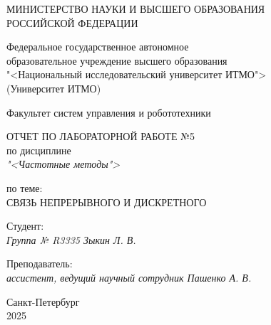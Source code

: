 \thispagestyle{empty}

\begin{center}
    МИНИСТЕРСТВО НАУКИ И ВЫСШЕГО ОБРАЗОВАНИЯ \\ РОССИЙСКОЙ ФЕДЕРАЦИИ

    \vspace{20pt}

    Федеральное государственное автономное \\ образовательное учреждение высшего образования \\
    "<Национальный исследовательский университет ИТМО"> \\
    (Университет ИТМО)

    \vspace{20pt}

    Факультет систем управления и робототехники
\end{center}

\vfill

\begin{center}
    ОТЧЕТ ПО ЛАБОРАТОРНОЙ РАБОТЕ №5\\  
    по дисциплине \\
    \textit{"<Частотные методы">}

    \vspace{20pt}

    по теме: \\
    \uppercase{Связь непрерывного и дискретного}
\end{center}

\vfill

    \noindent Студент: \\
    \textit{Группа № R3335 \hfill Зыкин Л. В.}

    \vspace{20pt}

    \noindent Преподаватель: \\
    \textit{ассистент, ведущий научный сотрудник \hfill Пашенко А. В.}

\vfill

\begin{center}
    Санкт-Петербург \\ 2025
\end{center}